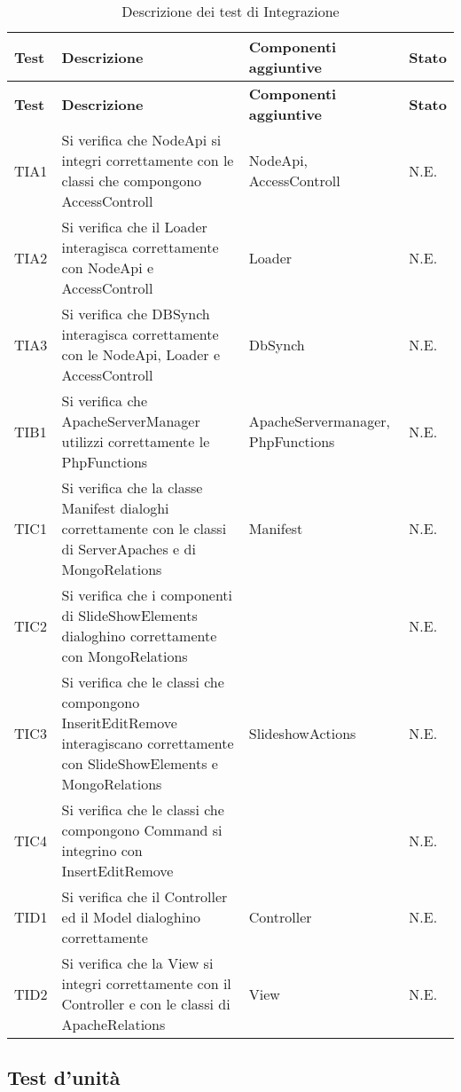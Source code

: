 {{	\begin{longtable} [c]{| p{2cm} | p{6cm} |p{3cm} | p{2cm} |}
			\caption{Descrizione dei test di Integrazione \label{tab:verReqInteg}}\\
		 \hline
		 \textbf{Test} & \textbf{Descrizione} & \textbf{Componenti aggiuntive}& \textbf{Stato} \\
		 \hline
		 \endfirsthead
		 \hline
		 \textbf{Test} & \textbf{Descrizione} & \textbf{Componenti aggiuntive}& \textbf{Stato} \\
		 \hline
			\endhead
		 \hline
		 \endfoot
		 \hline
		 \endlastfoot
			TIA1 & Si verifica che NodeApi si integri correttamente con le classi che compongono AccessControll & NodeApi, AccessControll & N.E.\\
			\hline
			TIA2 & Si verifica che il Loader interagisca correttamente con NodeApi e AccessControll  & Loader & N.E.\\
			\hline
			TIA3 & Si verifica che DBSynch interagisca correttamente con le NodeApi, Loader e AccessControll & DbSynch & N.E.\\
			\hline
			TIB1 & Si verifica che ApacheServerManager utilizzi correttamente le PhpFunctions & ApacheServermanager, PhpFunctions & N.E.\\
			\hline
			TIC1 & Si  verifica che la classe Manifest dialoghi correttamente con le classi di ServerApaches e di MongoRelations & Manifest & N.E.\\
			\hline
			TIC2 & Si verifica che i componenti di SlideShowElements dialoghino correttamente con MongoRelations &  & N.E.\\
			\hline
			TIC3 & Si verifica che le classi che compongono InseritEditRemove interagiscano correttamente con SlideShowElements e MongoRelations & SlideshowActions & N.E.\\
			\hline
			TIC4 & Si verifica che le classi che compongono Command si integrino con InsertEditRemove &  & N.E.\\
			\hline
			TID1 & Si verifica che il Controller  ed il Model dialoghino correttamente & Controller & N.E.\\
			\hline
			TID2 & Si verifica che la View si integri correttamente con il Controller e con le classi di ApacheRelations & View & N.E.\\
		\end{longtable}			
}
}
\newpage
\subsection{Test d'unità}


